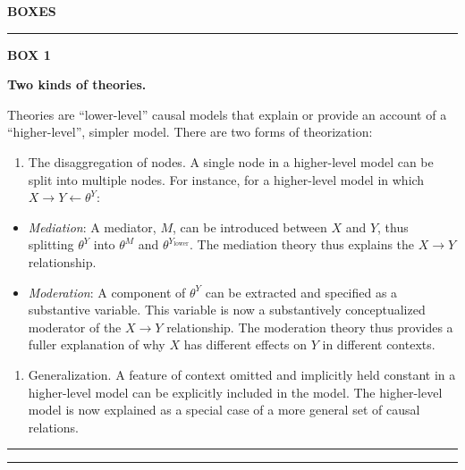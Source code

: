 \documentclass[12pt,]{book}
\providecommand{\tightlist}{%
  \setlength{\itemsep}{0pt}\setlength{\parskip}{0pt}}
\begin{document}
\textbf{BOXES}

\begin{center}\rule{0.5\linewidth}{\linethickness}\end{center}

\textbf{BOX 1}

\textbf{Two kinds of theories.}

Theories are ``lower-level'' causal models that explain or provide an account of a ``higher-level'', simpler model. There are two forms of theorization:

\begin{enumerate}
\def\labelenumi{\arabic{enumi}.}
\tightlist
\item
  The disaggregation of nodes. A single node in a higher-level model can be split into multiple nodes. For instance, for a higher-level model in which \(X \rightarrow Y \leftarrow \theta^Y\):
\end{enumerate}

\begin{itemize}
\tightlist
\item
  \emph{Mediation}: A mediator, \(M\), can be introduced between \(X\) and \(Y\), thus splitting \(\theta^Y\) into \(\theta^M\) and \(\theta^{Y_\text{lower}}\). The mediation theory thus explains the \(X \rightarrow Y\) relationship.
\item
  \emph{Moderation}: A component of \(\theta^Y\) can be extracted and specified as a substantive variable. This variable is now a substantively conceptualized moderator of the \(X \rightarrow Y\) relationship. The moderation theory thus provides a fuller explanation of why \(X\) has different effects on \(Y\) in different contexts.
\end{itemize}

\begin{enumerate}
\def\labelenumi{\arabic{enumi}.}
\setcounter{enumi}{1}
\tightlist
\item
  Generalization. A feature of context omitted and implicitly held constant in a higher-level model can be explicitly included in the model. The higher-level model is now explained as a special case of a more general set of causal relations.
\end{enumerate}

\begin{center}\rule{0.5\linewidth}{\linethickness}\end{center}

\begin{center}\rule{0.5\linewidth}{\linethickness}\end{center}
\end{document}
